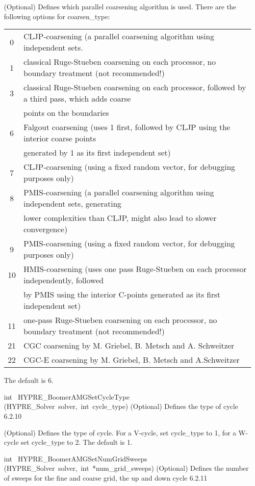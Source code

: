 \documentclass{article}
\begin{document}
\begin{cxxentry}
\begin{cxxentry}
\begin{cxxfunction}
\begin{cxxdoc}
(Optional) Defines which parallel coarsening algorithm is used.
There are the following options for coarsen\_type: 

\begin{tabular}{|c|l|} \hline
0 &	CLJP-coarsening (a parallel coarsening algorithm using independent sets. \\
1 &	classical Ruge-Stueben coarsening on each processor, no boundary treatment (not recommended!) \\
3 &	classical Ruge-Stueben coarsening on each processor, followed by a third pass, which adds coarse \\
& points on the boundaries \\
6 &   Falgout coarsening (uses 1 first, followed by CLJP using the interior coarse points \\
& generated by 1 as its first independent set) \\
7 &	CLJP-coarsening (using a fixed random vector, for debugging purposes only) \\
8 &	PMIS-coarsening (a parallel coarsening algorithm using independent sets, generating \\
& lower complexities than CLJP, might also lead to slower convergence) \\
9 &	PMIS-coarsening (using a fixed random vector, for debugging purposes only) \\
10 &	HMIS-coarsening (uses one pass Ruge-Stueben on each processor independently, followed \\
& by PMIS using the interior C-points generated as its first independent set) \\
11 &	one-pass Ruge-Stueben coarsening on each processor, no boundary treatment (not recommended!) \\
21 &	CGC coarsening by M. Griebel, B. Metsch and A. Schweitzer \\
22 &	CGC-E coarsening by M. Griebel, B. Metsch and A.Schweitzer \\
\hline
\end{tabular}

The default is 6. 
\end{cxxdoc}
\end{cxxfunction}
\begin{cxxfunction}
{int\ }
        {HYPRE\_BoomerAMGSetCycleType}
        {(HYPRE\_Solver\ solver,\ int\ cycle\_type)}
        {
(Optional) Defines the type of cycle}
        {6.2.10}
\begin{cxxdoc}

(Optional) Defines the type of cycle.
For a V-cycle, set cycle\_type to 1, for a W-cycle
set cycle\_type to 2. The default is 1.
\end{cxxdoc}
\end{cxxfunction}
\begin{cxxfunction}
{int\ }
        {HYPRE\_BoomerAMGSetNumGridSweeps}
        {(HYPRE\_Solver\ solver,\ int\ *num\_grid\_sweeps)}
        {
(Optional) Defines the number of sweeps for the fine and coarse grid, 
the up and down cycle}
        {6.2.11}
\begin{cxxdoc}


\end{cxxdoc}
\end{cxxfunction}
\end{cxxentry}
\end{cxxentry}
\end{document}
